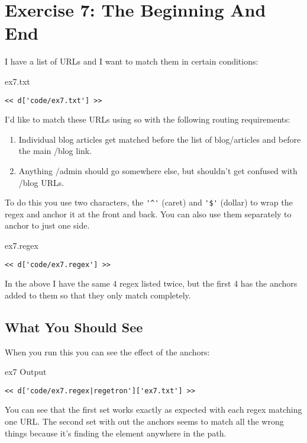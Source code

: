 \chapter{Exercise 7: The Beginning And End}

I have a list of URLs and I want to match them in certain conditions:

\begin{code}{ex7.txt}
\begin{Verbatim}
<< d['code/ex7.txt'] >>
\end{Verbatim}
\end{code}

I'd like to match these URLs using so with the following routing requirements:

\begin{enumerate}
\item Individual blog articles get matched before the list of blog/articles
    and before the main /blog link.
\item Anything /admin should go somewhere else, but shouldn't get confused
    with /blog URLs.
\end{enumerate}

To do this you use two characters, the \verb|'^'| (caret) and \verb|'$'| (dollar) to
wrap the regex and anchor it at the front and back.  You can also use them separately
to anchor to just one side.

\begin{code}{ex7.regex}
\begin{Verbatim}
<< d['code/ex7.regex'] >>
\end{Verbatim}
\end{code}

In the above I have the same 4 regex listed twice, but the first 4 has the 
anchors added to them so that they only match completely.

\section{What You Should See}

When you run this you can see the effect of the anchors:

\begin{code}{ex7 Output}
\begin{Verbatim}
<< d['code/ex7.regex|regetron']['ex7.txt'] >>
\end{Verbatim}
\end{code}

You can see that the first set works exactly as expected with each regex
matching one URL.  The second set with out the anchors seems to match
all the wrong things because it's finding the element anywhere in the
path.

